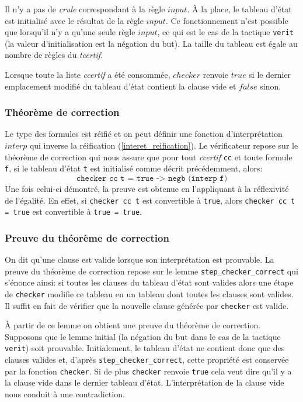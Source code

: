 \documentclass[11pt]{article}
\begin{document}
Il n'y a pas de \textit{crule} correspondant à la règle $input$. À la place, le tableau d'état est initialisé avec le résultat de la règle $input$. Ce fonctionnement n'est possible que lorsqu'il n'y a qu'une seule règle $input$, ce qui est le cas de la tactique \texttt{verit} (la valeur d'initialisation est la négation du but). La taille du tableau est égale au nombre de règles du \textit{tcertif}.\medbreak

Lorsque toute la liste \textit{ccertif} a été consommée, $checker$ renvoie $true$ si le dernier emplacement modifié du tableau d'état contient la clause vide et $false$ sinon.

\subsubsection{Théorème de correction}

Le type des formules est réifié et on peut définir une fonction d'interprétation $interp$ qui inverse la réification (\ref{interet_reification}). Le vérificateur repose sur le théorème de correction qui nous assure que pour tout \textit{ccertif} \texttt{cc} et toute formule \texttt{f}, si le tableau d'état \texttt{t} est initialisé comme décrit précédemment,  alors: 
\[ \texttt{checker cc t = true -> negb (interp f)} \]
 Une fois celui-ci démontré, la preuve est obtenue en l'appliquant à la réflexivité de l'égalité. En effet, si \texttt{checker cc t} est convertible à \texttt{true}, alors \texttt{checker cc t = true} est convertible à \texttt{true = true}.

\subsubsection{Preuve du théorème de correction} \label{preuve_correction}

On dit qu'une clause est valide lorsque son interprétation est prouvable. La preuve du théorème de correction repose sur le lemme \texttt{step\_checker\_correct} qui s'énonce ainsi: si toutes les clauses du tableau d'état sont valides alors une étape de \texttt{checker} modifie ce tableau en un tableau dont toutes les clauses sont valides. Il suffit en fait de vérifier que la nouvelle clause générée par \texttt{checker} est valide. \medbreak

À partir de ce lemme on obtient une preuve du théorème de correction. Supposons que le lemme initial (la négation du but dans le cas de la tactique \texttt{verit}) soit prouvable. Initialement, le tableau d'état ne contient donc que des clauses valides et, d'après \texttt{step\_checker\_correct}, cette propriété est conservée par la fonction \texttt{checker}. Si de plus \texttt{checker} renvoie \texttt{true} cela veut dire qu'il y a la clause vide dans le dernier tableau d'état. L'interprétation de la clause vide nous conduit à une contradiction.
\end{document}
